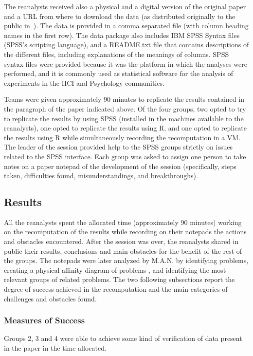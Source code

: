The reanalysts received also a physical and a digital version of the original paper and a URL from where to download the data (as distributed originally to the public in~\cite{Nacenta:memorability_data}). The data is provided in a comma separated file (with column heading names in the first row). The data package also includes IBM SPSS Syntax files (SPSS's scripting language), and a README.txt file that contains descriptions of the different files, including explanations of the meanings of columns. SPSS syntax files were provided because it was the platform in which the analyses were performed, and it is commonly used as statistical software for the analysis of experiments in the HCI and Psychology communities. 

Teams were given approximately 90 minutes to replicate the results contained in the paragraph of the paper indicated above. Of the four groups, two opted to try to replicate the results by using SPSS (installed in the machines available to the reanalysts), one opted to replicate the results using R, and one opted to replicate the results using R while simultaneously recording the recomputation in a VM. The leader of the session provided help to the SPSS groups strictly on issues related to the SPSS interface. Each group was asked to assign one person to take notes on a paper notepad of the development of the session (specifically, steps taken, difficulties found, misunderstandings, and breakthroughs).

\subsection{Results}
All the reanalysts spent the allocated time (approximately 90 minutes) working on the recomputation of the results while recording on their notepads the actions and obstacles encountered. After the session was over, the reanalysts shared in public their results, conclusions and main obstacles for the benefit of the rest of the groups. The notepads were later analyzed by M.A.N. by identifying problems, creating a physical affinity diagram of problems \cite{hartson:2012}, and identifying the most relevant groups of related problems. The two following subsections report the degree of success achieved in the recomputation and the main categories of challenges and obstacles found.

\subsubsection{Measures of Success}
Groups 2, 3 and 4 were able to achieve some kind of verification of data present in the paper in the time allocated.

